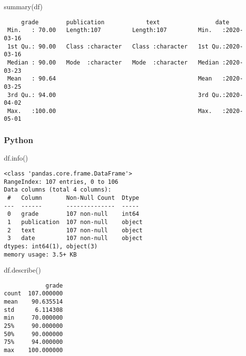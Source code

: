 \documentclass[
  letterpaper,
  DIV=11,
  numbers=noendperiod]{scrreprt}
\newenvironment{Shaded}{\begin{snugshade}}{\end{snugshade}}
\newcommand{\FunctionTok}[1]{\textcolor[rgb]{0.28,0.35,0.67}{#1}}
\newcommand{\NormalTok}[1]{\textcolor[rgb]{0.00,0.46,0.62}{#1}}
\begin{document}
\begin{Shaded}
\begin{Highlighting}[]
\FunctionTok{summary}\NormalTok{(df)}
\end{Highlighting}
\end{Shaded}

\begin{verbatim}
     grade        publication            text                date           
 Min.   : 70.00   Length:107         Length:107         Min.   :2020-03-16  
 1st Qu.: 90.00   Class :character   Class :character   1st Qu.:2020-03-16  
 Median : 90.00   Mode  :character   Mode  :character   Median :2020-03-23  
 Mean   : 90.64                                         Mean   :2020-03-25  
 3rd Qu.: 94.00                                         3rd Qu.:2020-04-02  
 Max.   :100.00                                         Max.   :2020-05-01  
\end{verbatim}

\hypertarget{python-5}{%
\subsubsection{Python}\label{python-5}}

\begin{Shaded}
\begin{Highlighting}[]
\NormalTok{df.info()}
\end{Highlighting}
\end{Shaded}

\begin{verbatim}
<class 'pandas.core.frame.DataFrame'>
RangeIndex: 107 entries, 0 to 106
Data columns (total 4 columns):
 #   Column       Non-Null Count  Dtype 
---  ------       --------------  ----- 
 0   grade        107 non-null    int64 
 1   publication  107 non-null    object
 2   text         107 non-null    object
 3   date         107 non-null    object
dtypes: int64(1), object(3)
memory usage: 3.5+ KB
\end{verbatim}

\begin{Shaded}
\begin{Highlighting}[]
\NormalTok{df.describe()}
\end{Highlighting}
\end{Shaded}

\begin{verbatim}
            grade
count  107.000000
mean    90.635514
std      6.114308
min     70.000000
25%     90.000000
50%     90.000000
75%     94.000000
max    100.000000
\end{verbatim}
\end{document}
